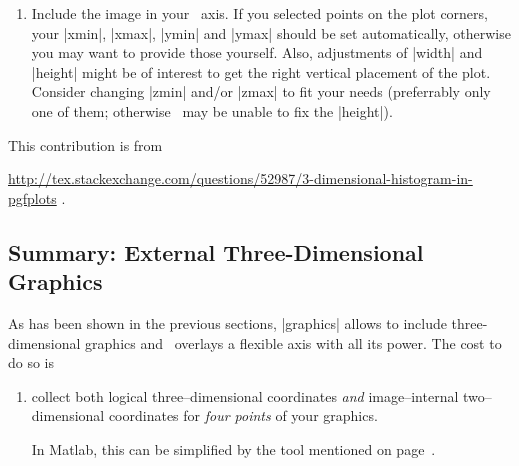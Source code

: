 {{\begin{enumerate}
\emph{If} you really want to use |pdf| output of Matlab, you may need to set the paper size to match the figure size by yourself, since the PDF driver does not automatically adjust the size:

\begin{codeexample}[code only]
currentScreenUnits=get(gcf,'Units')     %
currentPaperUnits=get(gcf,'PaperUnits') %
set(gcf,'Units',currentPaperUnits)      %
plotPosition=get(gcf,'Position')        %
set(gcf,'PaperSize',plotPosition(3:4))  %
set(gcf,'Units',currentScreenUnits)     %

print -dpdf matlabout      %
\end{codeexample}
\item Include the image in your \PGFPlots\ axis. If you selected points on the plot corners, your |xmin|, |xmax|, |ymin| and |ymax| should be set automatically, otherwise you may want to provide those yourself. Also, adjustments of |width| and |height| might be of interest to get the right vertical placement of the plot. Consider changing |zmin| and/or |zmax| to fit your needs (preferrably only one of them; otherwise \PGFPlots\ may be unable to fix the |height|).
\end{enumerate}

This contribution is from

\noindent
\url{http://tex.stackexchange.com/questions/52987/3-dimensional-histogram-in-pgfplots} .



\subsection*{Summary: External Three-Dimensional Graphics}
As has been shown in the previous sections,  |graphics| allows to include three-dimensional graphics and \PGFPlots\ overlays a flexible axis with all its power. The cost to do so is
\begin{enumerate}
	\item collect both logical three--dimensional coordinates \emph{and} image--internal two--dimensional coordinates for \emph{four points} of your graphics.

	In Matlab, this can be simplified by the tool mentioned on page~\pageref{sec:plotgraphics3d:matlabscript}.


\end{enumerate}}}
